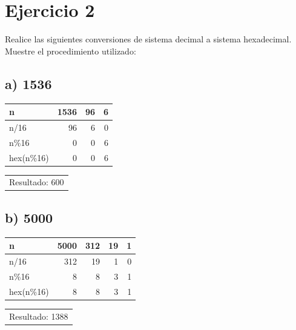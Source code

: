 \documentclass[12pt]{article}
\begin{document}
\section*{Ejercicio 2}
\label{sec:org15af2fb}
Realice las siguientes conversiones de sistema decimal a sistema hexadecimal. Muestre el procedimiento utilizado:

\subsection*{a) 1536}
\label{sec:org1e24b24}
\begin{mdframed}
\begin{center}
\begin{tabular}{lrrr}
n & 1536 & 96 & 6\\
\hline
n/16 & 96 & 6 & 0\\
n\%16 & 0 & 0 & 6\\
hex(n\%16) & 0 & 0 & 6\\
\end{tabular}
\end{center}

\begin{center}
\begin{tabular}{l}
Resultado: 600\\
\end{tabular}
\end{center}
\end{mdframed}

\subsection*{b) 5000}
\label{sec:org9933f56}
\begin{mdframed}
\begin{center}
\begin{tabular}{lrrrr}
n & 5000 & 312 & 19 & 1\\
\hline
n/16 & 312 & 19 & 1 & 0\\
n\%16 & 8 & 8 & 3 & 1\\
hex(n\%16) & 8 & 8 & 3 & 1\\
\end{tabular}
\end{center}

\begin{center}
\begin{tabular}{l}
Resultado: 1388\\
\end{tabular}
\end{center}
\end{mdframed}
\end{document}

